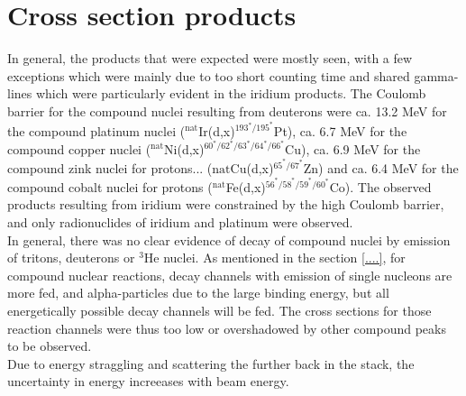 \section{Cross section products}

In general, the products that were expected were mostly seen, with a few exceptions which were mainly due to too short counting time and shared gamma-lines which were particularly evident in the iridium products. The Coulomb barrier for the compound nuclei resulting from deuterons were ca. 13.2 MeV for the compound platinum nuclei ($^\text{nat}$Ir(d,x)$^{193^*/195^*}$Pt), ca. 6.7 MeV for the compound copper nuclei ($^\text{nat}$Ni(d,x)$^{60^*/62^*/63^*/64^*/66^*}$Cu), ca. 6.9 MeV for the compound zink nuclei for protons... ($\text{nat}$Cu(d,x)$^{65^*/67^*}$Zn) and ca. 6.4 MeV for the compound cobalt nuclei for protons  ($^\text{nat}$Fe(d,x)$^{56^*/58^*/59^*/60^*}$Co). The observed products resulting from iridium were constrained by the high Coulomb barrier, and only radionuclides of iridium and platinum were observed. \\

In general, there was no clear evidence of decay of compound nuclei by emission of tritons, deuterons or $^{3}$He nuclei. As mentioned in the section \ref{....}, for compound nuclear reactions, decay channels with emission of single nucleons are more fed, and alpha-particles due to the large binding energy, but all energetically possible decay channels will be fed. The cross sections for those reaction channels were thus too low or overshadowed by other compound peaks to be observed. \\

Due to energy straggling and scattering the further back in the stack, the uncertainty in energy increeases with beam energy. 





